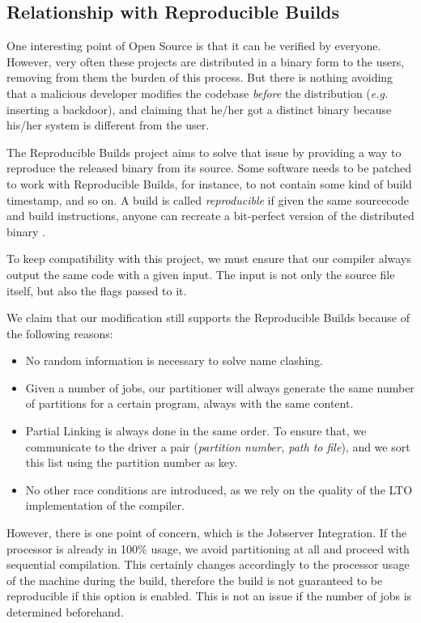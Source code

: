 \documentclass[runningheads]{llncs}
\begin{document}
\subsection{Relationship with Reproducible Builds}\label{sec:repro_builds}

One interesting point of Open Source is that it can be verified by everyone.
However, very often these projects are distributed in a binary form to the
users, removing from them the burden of this process. But there is nothing
avoiding that a malicious developer modifies the codebase \textit{before}
the distribution (\textit{e.g.} inserting a backdoor), and claiming that
he/her got a distinct binary because his/her system is different from the user.

The Reproducible Builds project aims to solve that issue by providing a way to
reproduce the released binary from its source. Some software needs to
be patched to work with Reproducible Builds, for instance,
to not contain some kind of build timestamp, and so on. A build
is called \textit{reproducible} if given the same sourcecode and build
instructions, anyone can recreate a bit-perfect version of the distributed
binary \cite{reproducible_builds}.

To keep compatibility with this project, we must ensure that our compiler
always output the same code with a given input. The input is not only
the source file itself, but also the flags passed to it.

We claim that our modification still supports the Reproducible Builds because
of the following reasons:

\begin{itemize}
	\item No random information is necessary to solve name clashing.
	\item Given a number of jobs, our partitioner will always generate
	the same number of partitions for a certain program, always with the same content.
	\item Partial Linking is always done in the same order. To ensure that,
	we communicate to the driver a pair (\textit{partition number, path to file}),
	and we sort this list using the partition number as key.
	\item No other race conditions are introduced, as we rely on the quality of
	the LTO implementation of the compiler.
\end{itemize}

However, there is one point of concern, which is the Jobserver Integration.  If
the processor is already in 100\% usage, we avoid partitioning at all and
proceed with sequential compilation. This certainly changes accordingly to the
processor usage of the machine during the build, therefore the build is not
guaranteed to be reproducible if this option is enabled. This is not an issue
if the number of jobs is determined beforehand.
\end{document}
